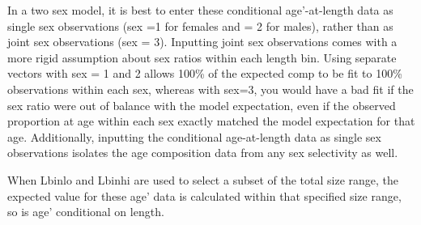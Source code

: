 In a two sex model, it is best to enter these conditional age’-at-length data as single sex observations (sex =1 for females and = 2 for males), rather than as joint sex observations (sex = 3).  Inputting joint sex observations comes with a more rigid assumption about sex ratios within each length bin. Using separate vectors with sex = 1 and 2 allows 100\% of the expected comp to be fit to 100\% observations within each sex, whereas with sex=3, you would have a bad fit if the sex ratio were out of balance with the model expectation, even if the observed proportion at age within each sex exactly matched the model expectation for that age.  Additionally, inputting the conditional age-at-length data as single sex observations isolates the age composition data from any sex selectivity as well.

When Lbin\textunderscore lo and Lbin\textunderscore hi are used to select a subset of the total size range, the expected value for these age’ data is calculated within that specified size range, so is age’ conditional on length.


